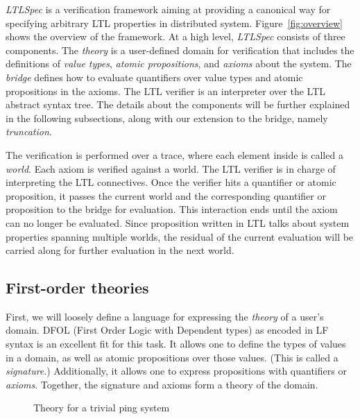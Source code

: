 \documentclass[format=acmsmall, nonacm=true, review=true]{acmart}
\newcommand{\mycaption}[1]{\Description{#1}\caption{#1}}
\newcommand{\ltlspec}{\textit{LTLSpec}\xspace}
\begin{document}
\ltlspec is a verification framework aiming at providing a canonical way for specifying arbitrary LTL properties in distributed system.
Figure~\ref{fig:overview} shows the overview of the framework.
At a high level, \ltlspec consists of three components.
The \textit{theory} is a user-defined domain for verification that includes the definitions of \textit{value types}, \textit{atomic propositions}, and \textit{axioms} about the system.
The \textit{bridge} defines how to evaluate quantifiers over value types and atomic propositions in the axioms.
The LTL verifier is an interpreter over the LTL abstract syntax tree.
The details about the components will be further explained in the following subsections, along with our extension to the bridge, namely \textit{truncation}.

The verification is performed over a trace, where each element inside is called a \textit{world}.
Each axiom is verified against a world. The LTL verifier is in charge of interpreting the LTL connectives.
Once the verifier hits a quantifier or atomic proposition, it passes the current world and the corresponding quantifier or proposition to the bridge for evaluation.
This interaction ends until the axiom can no longer be evaluated.
Since proposition written in LTL talks about system properties spanning multiple worlds, the residual of the current evaluation will be carried along for further evaluation in the next world.


\subsection{First-order theories}

First, we will loosely define a language for expressing the \textit{theory} of a user’s domain. DFOL (First Order Logic with Dependent types) as encoded in LF syntax \cite{hutchison_first-order_2006} is an excellent fit for this task. It allows one to define the types of values in a domain, as well as atomic propositions over those values. (This is called a \textit{signature}.) Additionally, it allows one to express propositions with quantifiers or \textit{axioms}. Together, the signature and axioms form a theory of the domain.

\begin{figure}[h]
  {
    \fontsize{10}{12}\selectfont
    
  }
  \mycaption{Theory for a trivial ping system}
  \label{fig:ping-theory}
\end{figure}
\end{document}
